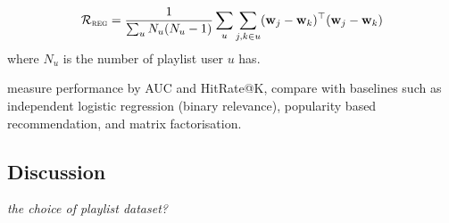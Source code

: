 \begin{equation*}
\mathcal{R}_\textsc{reg} = \frac{1}{\sum_u N_u (N_u - 1)} \sum_u \sum_{j, k \in u} (\mathbf{w}_j - \mathbf{w}_k)^\top (\mathbf{w}_j - \mathbf{w}_k)
\end{equation*}
where $N_u$ is the number of playlist user $u$ has.

\begin{table}[!h]
\centering
\caption{Empirical results}
\end{table}



\TODO
measure performance by AUC and HitRate@K,
compare with baselines such as independent logistic regression (\ie binary relevance), popularity based recommendation,
and matrix factorisation.



\subsection{Discussion}

{\it the choice of playlist dataset?}
